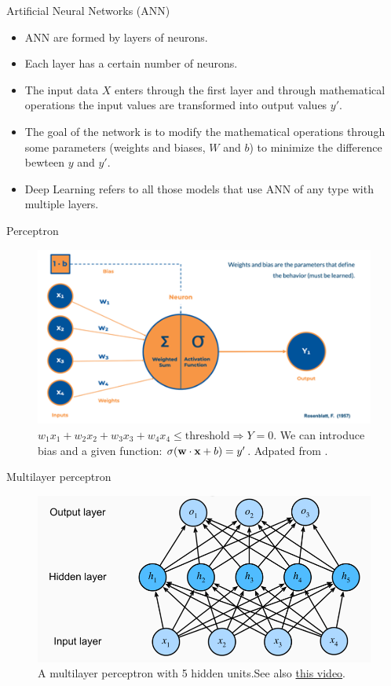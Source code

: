 \documentclass{beamer}
\begin{document}
\begin{frame}{Artificial Neural Networks (ANN)}
    \begin{itemize}
        \item ANN are formed by layers of neurons.
        \item Each layer has a certain number of neurons.
        \item The input data $X$ enters through the first layer and through mathematical operations the input values are transformed into output values $y'$.
        \item The goal of the network is to modify the mathematical operations through some parameters (weights and biases, $W$ and $b$) to minimize the difference bewteen $y$ and $y'$.
        \item Deep Learning refers to all those models that use ANN of any type with multiple layers.
    \end{itemize}
\end{frame}



\begin{frame}{Perceptron}
    \begin{figure}
        \includegraphics[width=0.9\linewidth]{perceptron}
        \caption{$w_1 x_1 + w_2 x_2 +w_3x_3+w_4x_4 \leq \mathrm{threshold} \Rightarrow Y=0$. We can introduce bias and a given function: $\sigma(\textbf{w}\cdot \textbf{x}+b)=y'$. Adpated from \cite{rosenblatt_perceptron_1958}.}
        \label{Fig:perceptron}
    \end{figure}
\end{frame}

\begin{frame}{Multilayer perceptron}
    \begin{figure}
        \includegraphics[width=0.9\linewidth]{MLP}
        \caption{A multilayer perceptron with 5 hidden units.See also \href{https://youtu.be/aircAruvnKk?si=J6nqx_aSnjgYggvm}{this video}.}
        \label{Fig:perceptron}
    \end{figure}
\end{frame}
\end{document}
